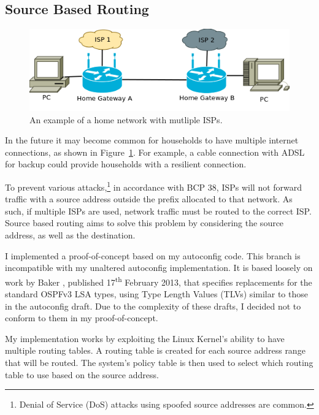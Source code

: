 \subsection{Source Based Routing}
\label{SourceBasedRouting}
\begin{figure}
\begin{center}
	\includegraphics[width=\linewidth]{../Diagrams/Network/MultipleISP.png}
	\caption{An example of a home network with mutliple ISPs.}\label{fig:MultipleISP}
\end{center}
\end{figure}
In the future it may become common for households to have multiple internet
connections, as shown in Figure~\ref{fig:MultipleISP}. For example, a cable
connection with ADSL for backup could provide households with a resilient
connection. 

To prevent various attacks,\footnote{Denial of Service
(DoS) attacks using spoofed source
addresses are common.} in accordance with BCP 38\cite{bcp38}, ISPs will not
forward traffic with a source address outside the prefix allocated to that
network. As such, if multiple ISPs are used, network traffic must be routed to
the correct ISP\@. Source based routing aims to solve this problem by considering
the source address, as well as the destination. 

I implemented a proof-of-concept based on my autoconfig code. This branch is
incompatible with my unaltered autoconfig implementation. It is based loosely
on work by Baker \cite{draft-baker-ipv6-ospf-extensible-00}
\cite{draft-baker-ipv6-ospf-dst-src-routing-00}, published
17\textsuperscript{th} February 2013, that specifies replacements for the
standard OSPFv3 LSA types, using Type Length Values (TLVs) similar to those in
the autoconfig draft. Due to the complexity of these drafts, I decided not to
conform to them in my proof-of-concept.

My implementation works by exploiting the Linux Kernel's ability to have
multiple routing tables. A routing table is created for each source address
range that will be routed. The system's policy table is then used to select
which routing table to use based on the source address.  


